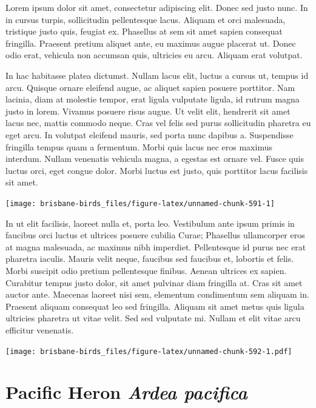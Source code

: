 \documentclass[]{book}
\let\origfigure\figure
\let\endorigfigure\endfigure
\renewenvironment{figure}[1][2] {
  \expandafter\origfigure\expandafter[H]
} {
  \endorigfigure
}
\begin{document}
Lorem ipsum dolor sit amet, consectetur adipiscing elit. Donec sed justo
nunc. In in cursus turpis, sollicitudin pellentesque lacus. Aliquam et
orci malesuada, tristique justo quis, feugiat ex. Phasellus at sem sit
amet sapien consequat fringilla. Praesent pretium aliquet ante, eu
maximus augue placerat ut. Donec odio erat, vehicula non accumsan quis,
ultricies eu arcu. Aliquam erat volutpat.

In hac habitasse platea dictumst. Nullam lacus elit, luctus a cursus ut,
tempus id arcu. Quisque ornare eleifend augue, ac aliquet sapien posuere
porttitor. Nam lacinia, diam at molestie tempor, erat ligula vulputate
ligula, id rutrum magna justo in lorem. Vivamus posuere risus augue. Ut
velit elit, hendrerit sit amet lacus nec, mattis commodo neque. Cras vel
felis sed purus sollicitudin pharetra eu eget arcu. In volutpat eleifend
mauris, sed porta nunc dapibus a. Suspendisse fringilla tempus quam a
fermentum. Morbi quis lacus nec eros maximus interdum. Nullam venenatis
vehicula magna, a egestas est ornare vel. Fusce quis luctus orci, eget
congue dolor. Morbi luctus est justo, quis porttitor lacus facilisis sit
amet.

\begin{figure}
\texttt{[image: brisbane-birds\_files/figure-latex/unnamed-chunk-591-1]} \caption{insert figure caption}\label{fig:unnamed-chunk-591}
\end{figure}

In ut elit facilisis, laoreet nulla et, porta leo. Vestibulum ante ipsum
primis in faucibus orci luctus et ultrices posuere cubilia Curae;
Phasellus ullamcorper eros at magna malesuada, ac maximus nibh
imperdiet. Pellentesque id purus nec erat pharetra iaculis. Mauris velit
neque, faucibus sed faucibus et, lobortis et felis. Morbi suscipit odio
pretium pellentesque finibus. Aenean ultrices ex sapien. Curabitur
tempus justo dolor, sit amet pulvinar diam fringilla at. Cras sit amet
auctor ante. Maecenas laoreet nisi sem, elementum condimentum sem
aliquam in. Praesent aliquam consequat leo sed fringilla. Aliquam sit
amet metus quis ligula ultricies pharetra ut vitae velit. Sed sed
vulputate mi. Nullam et elit vitae arcu efficitur venenatis.

\begin{figure}
\centering
\texttt{[image: brisbane-birds\_files/figure-latex/unnamed-chunk-592-1.pdf]}
\caption{\label{fig:unnamed-chunk-592}insert figure caption}
\end{figure}

\section{\texorpdfstring{Pacific Heron \emph{Ardea
pacifica}}{Pacific Heron Ardea pacifica}}\label{pacific-heron-ardea-pacifica}
\end{document}
